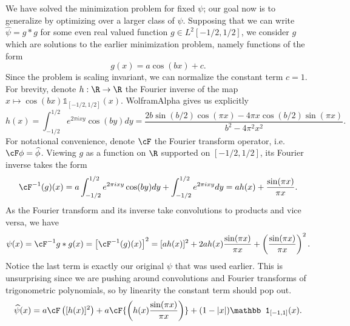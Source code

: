 We have solved the minimization problem for fixed $\psi$; our goal now is to generalize by optimizing over a larger class of $\psi$. Supposing that we can write $\widehat\psi = g * g$ for some even real valued function $g \in L^2 [-1/2, 1/2]$, we consider $g$ which are solutions to the earlier minimization problem, namely functions of the form 
	\[ g(x) = a \cos (bx) + c. \]
Since the problem is scaling invariant, we can normalize the constant term $c = 1$. For brevity, denote $h : \R \to \R$ the Fourier inverse of the map $x \mapsto \cos (bx) \mathbb 1_{[-1/2, 1/2]} (x)$. WolframAlpha gives us explicitly
	\begin{equation}
		h(x) = \int_{-1/2}^{1/2} e^{2\pi i x y } \cos(by) dy = \frac{2b \sin(b/2) \cos(\pi x) - 4\pi x \cos(b/2) \sin(\pi x)}{b^2 - 4 \pi^2 x^2}. 
	\end{equation}	
For notational convenience, denote $\cF$ the Fourier transform operator, i.e. $\cF \phi = \widehat \phi$. Viewing $g$ as a function on $\R$ supported on $[-1/2, 1/2]$, its Fourier inverse takes the form
	\[ 
		\cF^{-1} (g) (x) = a \int_{-1/2}^{1/2} e^{2\pi i x y} \cos(by) dy + \int_{-1/2}^{1/2} e^{2\pi i x y} dy  = a h(x) + \frac{\sin(\pi x)}{\pi x}.
	\]
As the Fourier transform and its inverse take convolutions to products and vice versa, we have 
	\begin{equation}
		\psi(x) 
			= \cF^{-1 } {g * g} (x)
			= \left[\cF^{-1}(g) (x)\right]^2 
			= [ah(x)]^2 + 2 a h(x) \frac{\sin(\pi x)}{\pi x} + \left( \frac{\sin (\pi x)}{\pi x} \right)^2.
	\end{equation}
Notice the last term is exactly our original $\psi$ that was used earlier. This is unsurprising since we are pushing around convolutions and Fourier transforms of trigonometric polynomials, so by linearity the constant term should pop out. 
	\[ \widehat \psi (x) = a \cF \left( [h(x)]^2\right)+  a \cF { \left( h(x) \frac{\sin (\pi x)}{\pi x} \right)} + (1 - |x|) \mathbb 1_{[-1, 1]} (x). \]	